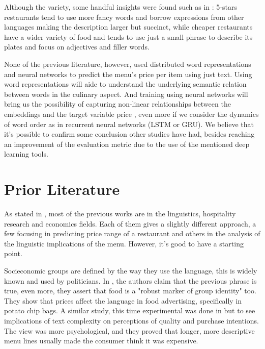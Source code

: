 \documentclass[11pt,letterpaper]{article}
\begin{document}
Although the variety, some handful insights were found such as in \cite{chahuneau2012word,jurafsky2014language,jurafsky2016bordieu}: 5-stars restaurants tend to use more fancy words and borrow expressions from other languages making the description larger but succinct, while cheaper restaurants have a wider variety of food and tends to use just a small phrase to describe its plates and focus on adjectives and filler words. 

None of the previous literature, however, used distributed word representations and neural networks to predict the menu's price per item using just text. Using word representations will aide to understand the underlying semantic relation between words \cite{mikolov2013efficient} in the culinary aspect. And training using neural networks will bring us the possibility of capturing non-linear relationships \cite{beale1990neural} between the embeddings and the target variable price , even more if we consider the dynamics of word order as in recurrent neural networks (LSTM or GRU). We believe that it's possible to confirm some conclusion other studies have had, besides reaching an improvement of the evaluation metric due to the use of the mentioned deep learning tools.


\section{Prior Literature}

As stated in \cite{chahuneau2012word}, most of the previous works are in the linguistics, hospitality research and economics fields. Each of them gives a slightly different approach, a few focusing in predicting price range of a restaurant and others in the analysis of the linguistic implications of the menu. However, it's good to have a starting point.

Socieconomic groups are defined by the way they use the language, this is widely known and used by politicians. In \cite{freedman2011authenticity}, the authors claim that the previous phrase is true, even more, they assert that food is a "robust marker of group identity" too. They show that prices affect the language in food advertising, specifically in potato chip bags. A similar study, this time experimental was done in \cite{mccall2008effects} but to see implications of text complexity on perceptions of quality and purchase intentions. The view was more psychological, and they proved that longer, more descriptive menu lines usually made the consumer think it was expensive.
\end{document}
